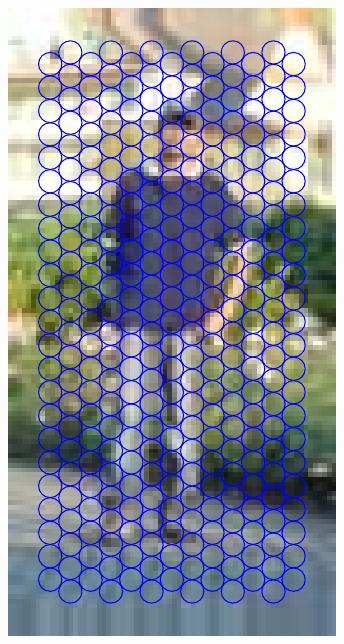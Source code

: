 \documentclass[thesis.tex]{subfiles}
\begin{document}
\begin{figure}
\begin{subfigure}[t]{0.135\textwidth}
		\includegraphics[width=\textwidth]{img/inriaExampleCells.pdf}
		\caption{}
		\vspace{2mm}
	\end{subfigure}
	\begin{subfigure}[t]{0.135\textwidth}

\end{subfigure}
\end{figure}
\end{document}
